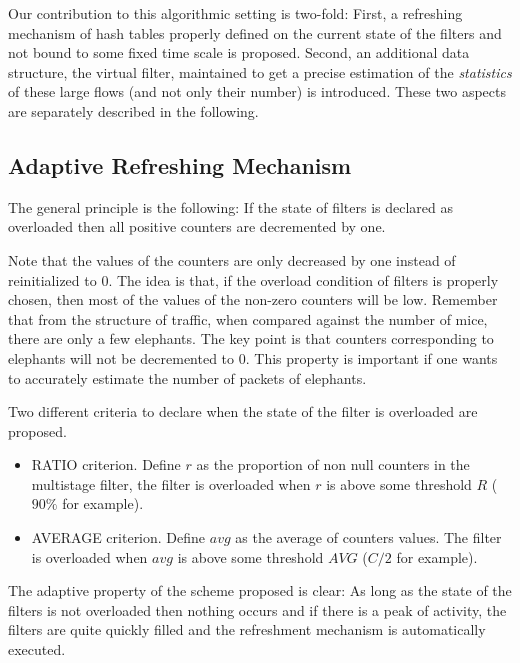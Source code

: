\documentclass{amsart}
\begin{document}
Our contribution to this algorithmic setting is two-fold: First, a refreshing mechanism of
hash tables  properly defined on the  current state of the  filters and not  bound to some
fixed time scale is proposed.  Second, an additional data structure,  the virtual filter, maintained
to get  a precise estimation  of the {\em  statistics} of these  large flows (and  not only
their number) is introduced.  These two aspects are  separately described in the following.

\subsection{Adaptive Refreshing Mechanism}
The general principle is the following: If the state of filters is declared as overloaded
then all positive counters are decremented by one.  

Note that  the values of the counters are only decreased by one
instead of reinitialized to
$0$. The idea is that, if the overload condition of  filters is properly chosen, then most of the
values of the non-zero counters will be low. Remember that from the structure of traffic, when compared
against  the number of mice, there are only a  few elephants. The key point  is that counters
corresponding to elephants will not be decremented  to $0$. This property is important if one wants to
accurately estimate the number of packets of elephants.
 
Two different criteria to declare when the state of the filter is overloaded are proposed. 
\begin{itemize}	
		\item RATIO criterion.  Define $r$ as the proportion of non null counters in the multistage
                  filter,  the filter is overloaded when $r$ is above some  threshold $R$
                  ($90\%$ for example). 
		\item AVERAGE criterion. Define $avg$  as the average of counters values. The filter  is overloaded
                  when  $avg$ is above some  threshold $AVG$ ($C/2$ for example). 
\end{itemize}
The adaptive property of the scheme proposed is clear: As long as the state of the filters
is not overloaded then nothing occurs and if there is a peak of activity,  the
filters are quite quickly filled and the refreshment mechanism is automatically executed. 
\end{document}
